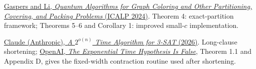 \documentclass[11pt,a4paper]{article}
\theoremstyle{problemstyle}
\newenvironment{algorithmindex}[1]{%
  \begin{enumerate}[label={[#1.\arabic*]},leftmargin=3.4em,labelsep=0.6em,itemsep=4pt,topsep=3pt,parsep=0pt]
  \small
}{\end{enumerate}}
\begin{document}
\begin{algorithmindex}{23}
\item \href{https://arxiv.org/pdf/2311.08042}{Gaspers and Li, \emph{Quantum Algorithms for Graph Coloring and Other Partitioning, Covering, and Packing Problems} (ICALP 2024)}. Theorem 4: exact-partition framework; Theorems 5--6 and Corollary 1: improved small-$c$ implementation.
\item \href{https://github.com/anthropics/formal-math/tree/main/eth}{Claude (Anthropic), \emph{A $2^{o(n)}$ Time Algorithm for 3-SAT} (2026)}. Long-clause shortening; \href{https://github.com/openai/math/blob/main/preprints/The-Exponential-Time-Hypothesis-is-False-October-25-2026/paper.pdf}{OpenAI, \emph{The Exponential Time Hypothesis Is False}}, Theorem 1.1 and Appendix D, gives the fixed-width contraction routine used after shortening.
\end{algorithmindex}
\end{document}
